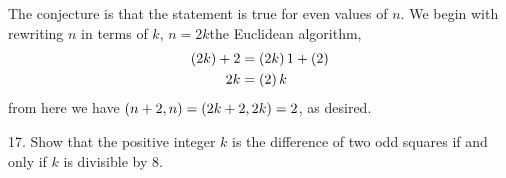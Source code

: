 \begin{mdframed}[style=darkAnswer,frametitle={Joe Starr}]
The conjecture is that the statement is true for even values of $n$.
We begin with rewriting $n$ in terms of $k$, $n=2k$the Euclidean algorithm, 
\begin{align*}
    \left(2k\right)+2&=\left(2k\right)1+\left(2\right)\\
    2k&=\left(2\right){k}\\
\end{align*}
from here we have $\left(n+2,n\right)=\left(2k+2,2k\right)=2$, as desired.
\end{mdframed}
\newpage
\begin{mdframed}[style=darkQuesion]
17.  Show that the positive integer $k$ is the difference of two odd squares if 
and only if $k$ is divisible by $8$.
\end{mdframed}

